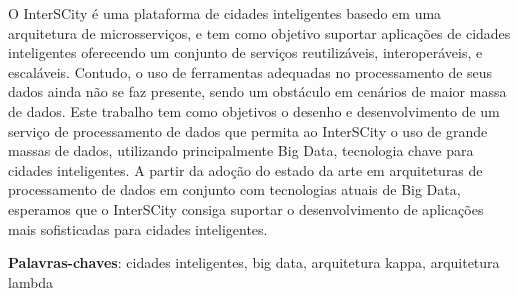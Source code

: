 \begin{resumo}

    O InterSCity é uma plataforma de cidades inteligentes basedo em uma
    arquitetura de microsserviços, e tem como objetivo suportar aplicações de %
    cidades inteligentes oferecendo um conjunto de serviços reutilizáveis,
    interoperáveis, e escaláveis. Contudo, o uso de ferramentas adequadas no
    processamento de seus dados ainda não se faz presente, sendo um obstáculo
    em cenários de maior massa de dados. Este trabalho tem como objetivos o
    desenho e desenvolvimento de um serviço de processamento de dados que
    permita ao InterSCity o uso de grande massas de dados, utilizando
    principalmente Big Data, tecnologia chave para cidades inteligentes. A
    partir da adoção do estado da arte em arquiteturas de processamento de
    dados em conjunto com tecnologias atuais de Big Data, esperamos que o
    InterSCity consiga suportar o desenvolvimento de aplicações mais
    sofisticadas para cidades inteligentes.

 \vspace{\onelineskip}
 \noindent
 \textbf{Palavras-chaves}: cidades inteligentes, big data, arquitetura kappa, arquitetura lambda
\end{resumo}
